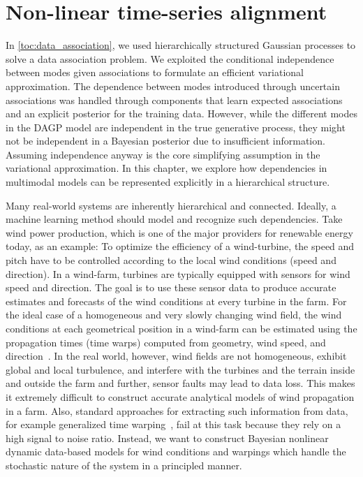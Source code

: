 \chapter{Non-linear time-series alignment}
\label{toc:alignment}
In \cref{toc:data_association}, we used hierarchically structured Gaussian processes to solve a data association problem.
We exploited the conditional independence between modes given associations to formulate an efficient variational approximation.
The dependence between modes introduced through uncertain associations was handled through components that learn expected associations and an explicit posterior for the training data.
However, while the different modes in the DAGP model are independent in the true generative process, they might not be independent in a Bayesian posterior due to insufficient information.
Assuming independence anyway is the core simplifying assumption in the variational approximation.
In this chapter, we explore how dependencies in multimodal models can be represented explicitly in a hierarchical structure.

Many real-world systems are inherently hierarchical and connected.
Ideally, a machine learning method should model and recognize such dependencies.
Take wind power production, which is one of the major providers for renewable energy today, as an example:
To optimize the efficiency of a wind-turbine, the speed and pitch have to be controlled according to the local wind conditions (speed and direction).
In a wind-farm, turbines are typically equipped with sensors for wind speed and direction.
The goal is to use these sensor data to produce accurate estimates and forecasts of the wind conditions at every turbine in the farm.
For the ideal case of a homogeneous and very slowly changing wind field, the wind conditions at each geometrical position in a wind-farm can be estimated using the propagation times (time warps) computed from geometry, wind speed, and direction~\parencite{soleimanzadeh_controller_2011,bitar_coordinated_2013,schepers_improved_2007}.
In the real world, however, wind fields are not homogeneous, exhibit global and local turbulence, and interfere with the turbines and the terrain inside and outside the farm and further, sensor faults may lead to data loss.
This makes it extremely difficult to construct accurate analytical models of wind propagation in a farm.
Also, standard approaches for extracting such information from data, for example generalized time warping~\parencite{zhou_generalized_2012}, fail at this task because they rely on a high signal to noise ratio.
Instead, we want to construct Bayesian nonlinear dynamic data-based models for wind conditions and warpings which handle the stochastic nature of the system in a principled manner.

